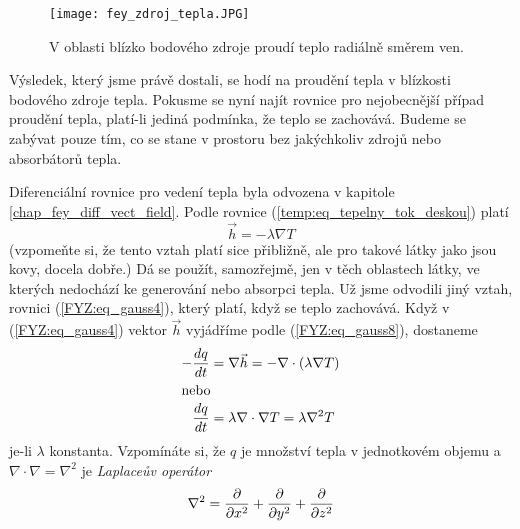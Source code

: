       \begin{figure}
       \centering
       \texttt{[image: fey\_zdroj\_tepla.JPG]}
       \caption{V oblasti blízko bodového zdroje proudí teplo radiálně směrem ven.}
       \label{fyz:fig_fey_zdroj_tepla}
      \end{figure}                           
      
      Výsledek, který jsme právě dostali, se hodí na proudění tepla v blízkosti bodového zdroje 
      tepla. Pokusme se nyní najít rovnice pro nejobecnější případ proudění tepla, platí-li jediná 
      podmínka, že teplo se zachovává. Budeme se zabývat pouze tím, co se stane v prostoru bez 
      jakýchkoliv zdrojů nebo absorbátorů tepla.
      
      Diferenciální rovnice pro vedení tepla byla odvozena v kapitole \ref{chap_fey_diff_vect_field}. Podle 
      rovnice (\ref{temp:eq_tepelny_tok_deskou}) platí
      \begin{equation}\label{FYZ:eq_gauss8}
      \vec{h}=-\lambda\nabla T
      \end{equation}    
      (vzpomeňte si, že tento vztah platí sice přibližně, ale pro takové látky jako jsou kovy, 
      docela dobře.) Dá se použít, samozřejmě, jen v těch oblastech látky, ve kterých nedochází ke 
      generování nebo absorpci tepla. Už jsme odvodili jiný vztah, rovnici (\ref{FYZ:eq_gauss4}), 
      který platí, když se teplo zachovává. Když v (\ref{FYZ:eq_gauss4}) vektor \(\vec{h}\) 
      vyjádříme podle (\ref{FYZ:eq_gauss8}), dostaneme
      \begin{align}
        - \frac{d q}{d t} &= \nabla\vec{h} = - \nabla\cdot(\lambda\nabla T)     \nonumber    \\ 
        \intertext{nebo}
          \frac{d q}{d t} &= \lambda\nabla\cdot\nabla T = \lambda\nabla^2 T     \label{FYZ:eq_gauss9}
      \end{align}
      je-li \(\lambda\) konstanta. Vzpomínáte si, že \(q\) je množství tepla v jednotkovém objemu a
      \(\nabla\cdot\nabla = \nabla^2\) je \emph{Laplaceův operátor}
      \begin{equation*}
        \nabla^2= \frac{\partial  }{\partial x^2} + \frac{\partial  }{\partial y^2} + \frac{\partial  }{\partial z^2}
      \end{equation*}       
    
